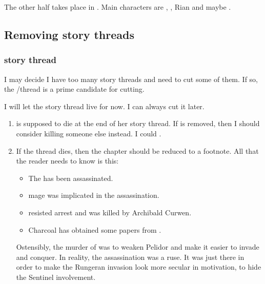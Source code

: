 The other half takes place in \Malcur. 
Main characters are \Teshrial, \MoroCobrel, Rian and maybe \Tiroco. 










\subsection{Removing story threads}





\subsubsection{\Tiroco story thread}
I may decide I have too many story threads and need to cut some of them.
If so, the \Tiroco/\Icor thread is a prime candidate for cutting. 

I will let the story thread live for now. 
I can always cut it later.

\begin{enumerate}
  \item 
    \Tiroco is supposed to die at the end of her story thread. 
    If \Tiroco is removed, then I should consider killing someone else instead. 
    I could . 
    
  \item 
    If the \Tiroco thread dies, then the  chapter should be reduced to a footnote.
    All that the reader needs to know is this:
    \begin{itemize}
      \item The \rayuth has been assassinated.
      \item \Ishrah mage \Ambrose \Onatol was implicated in the assassination.
      \item \Onatol resisted arrest and was killed by Archibald Curwen.
      \item Charcoal has obtained some papers from \Onatol. 
    \end{itemize}
    
    Ostensibly, the murder of \Icor was to weaken Pelidor and make it easier to invade and conquer. 
    In reality, the assassination was a ruse.
    It was just there in order to make the Rungeran invasion look more secular in motivation, to hide the Sentinel involvement. 
\end{enumerate}
























